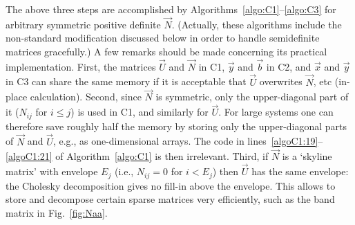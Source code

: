 \documentclass[structabstract]{aa}
\begin{document}
The above three steps are accomplished by 
Algorithms~\ref{algo:C1}--\ref{algo:C3} for arbitrary symmetric
positive definite $\vec{N}$. (Actually, these algorithms include the
non-standard modification discussed below in order to handle 
semidefinite matrices gracefully.) A few remarks should be made concerning
its practical implementation. First, the matrices $\vec{U}$ and $\vec{N}$
in C1, $\vec{y}$ and $\vec{b}$ in C2, and $\vec{x}$ and $\vec{y}$ in C3
can share the same memory if it is acceptable that $\vec{U}$ overwrites 
$\vec{N}$, etc (in-place calculation). Second, since $\vec{N}$ is symmetric,
only the upper-diagonal part of it ($N_{ij}$ for $i\le j$) is used in C1, and 
similarly for $\vec{U}$. For large systems one can therefore save roughly 
half the memory by storing only the upper-diagonal parts of $\vec{N}$ 
and $\vec{U}$, e.g., as one-dimensional arrays. The code in 
lines~\ref{algoC1:19}--\ref{algoC1:21} of 
Algorithm~\ref{algo:C1} is then irrelevant.
Third, if $\vec{N}$ is a `skyline matrix' with envelope $E_j$ (i.e.,
$N_{ij}=0$ for $i<E_j$) then $\vec{U}$ has the same envelope: the
Cholesky decomposition gives no fill-in above the envelope. This
allows to store and decompose certain sparse matrices very efficiently,
such as the band matrix in Fig.~\ref{fig:Naa}.




\begin{algorithm}[t]
\caption{Returns upper-triangular $\vec{U}$ such that 
$\vec{U}'\vec{U}=\vec{N}$, where $\vec{N}\in\mathbb R^{n\times n}$ 
is symmetric and positive semidefinite. Also computes an estimate $d$
of the rank defect of $\vec{N}$.}
\label{algo:C1}
\begin{algorithmic}[1]
			\ELSE
			\ENDIF
		\ELSE
			\ELSE
			\ENDIF
		\ENDIF
	\ENDFOR
	\label{algoC1:19}
    \ENDFOR\label{algoC1:21}
\ENDFOR
\end{algorithmic}
\end{algorithm}



\begin{algorithm}[t]
\caption{Returns $\vec{y}$ such that $\vec{U}'\vec{y}=\vec{b}$, where
$\vec{U}\in\mathbb R^{n\times n}$ is upper-triangular and $\vec{b}\in\mathbb R^{n}$.}
\label{algo:C2}
\begin{algorithmic}[1]
	\ELSE
	\ENDIF
\ENDFOR
\end{algorithmic}
\end{algorithm}
\end{document}
